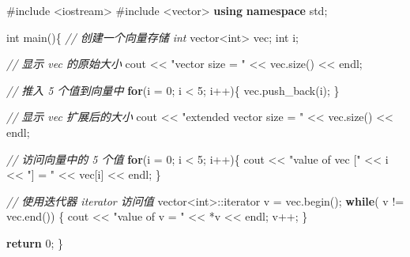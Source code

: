 \documentclass[
]{article}
\newenvironment{Shaded}{}{}
\newcommand{\CommentTok}[1]{\textcolor[rgb]{0.38,0.63,0.69}{\textit{#1}}}
\newcommand{\ControlFlowTok}[1]{\textcolor[rgb]{0.00,0.44,0.13}{\textbf{#1}}}
\newcommand{\DataTypeTok}[1]{\textcolor[rgb]{0.56,0.13,0.00}{#1}}
\newcommand{\DecValTok}[1]{\textcolor[rgb]{0.25,0.63,0.44}{#1}}
\newcommand{\ImportTok}[1]{#1}
\newcommand{\KeywordTok}[1]{\textcolor[rgb]{0.00,0.44,0.13}{\textbf{#1}}}
\newcommand{\NormalTok}[1]{#1}
\newcommand{\OperatorTok}[1]{\textcolor[rgb]{0.40,0.40,0.40}{#1}}
\newcommand{\PreprocessorTok}[1]{\textcolor[rgb]{0.74,0.48,0.00}{#1}}
\newcommand{\StringTok}[1]{\textcolor[rgb]{0.25,0.44,0.63}{#1}}
\begin{document}
\begin{Shaded}
\begin{Highlighting}[]
\PreprocessorTok{\#include }\ImportTok{\textless{}iostream\textgreater{}}
\PreprocessorTok{\#include }\ImportTok{\textless{}vector\textgreater{}}
\KeywordTok{using} \KeywordTok{namespace}\NormalTok{ std}\OperatorTok{;}

\DataTypeTok{int}\NormalTok{ main}\OperatorTok{()\{}
   \CommentTok{// 创建一个向量存储 int}
\NormalTok{   vector}\OperatorTok{\textless{}}\DataTypeTok{int}\OperatorTok{\textgreater{}}\NormalTok{ vec}\OperatorTok{;} 
   \DataTypeTok{int}\NormalTok{ i}\OperatorTok{;}

   \CommentTok{// 显示 vec 的原始大小}
\NormalTok{   cout }\OperatorTok{\textless{}\textless{}} \StringTok{"vector size = "} \OperatorTok{\textless{}\textless{}}\NormalTok{ vec}\OperatorTok{.}\NormalTok{size}\OperatorTok{()} \OperatorTok{\textless{}\textless{}}\NormalTok{ endl}\OperatorTok{;}

   \CommentTok{// 推入 5 个值到向量中}
   \ControlFlowTok{for}\OperatorTok{(}\NormalTok{i }\OperatorTok{=} \DecValTok{0}\OperatorTok{;}\NormalTok{ i }\OperatorTok{\textless{}} \DecValTok{5}\OperatorTok{;}\NormalTok{ i}\OperatorTok{++)\{}
\NormalTok{      vec}\OperatorTok{.}\NormalTok{push\_back}\OperatorTok{(}\NormalTok{i}\OperatorTok{);}
   \OperatorTok{\}}

   \CommentTok{// 显示 vec 扩展后的大小}
\NormalTok{   cout }\OperatorTok{\textless{}\textless{}} \StringTok{"extended vector size = "} \OperatorTok{\textless{}\textless{}}\NormalTok{ vec}\OperatorTok{.}\NormalTok{size}\OperatorTok{()} \OperatorTok{\textless{}\textless{}}\NormalTok{ endl}\OperatorTok{;}

   \CommentTok{// 访问向量中的 5 个值}
   \ControlFlowTok{for}\OperatorTok{(}\NormalTok{i }\OperatorTok{=} \DecValTok{0}\OperatorTok{;}\NormalTok{ i }\OperatorTok{\textless{}} \DecValTok{5}\OperatorTok{;}\NormalTok{ i}\OperatorTok{++)\{}
\NormalTok{      cout }\OperatorTok{\textless{}\textless{}} \StringTok{"value of vec ["} \OperatorTok{\textless{}\textless{}}\NormalTok{ i }\OperatorTok{\textless{}\textless{}} \StringTok{"] = "} \OperatorTok{\textless{}\textless{}}\NormalTok{ vec}\OperatorTok{[}\NormalTok{i}\OperatorTok{]} \OperatorTok{\textless{}\textless{}}\NormalTok{ endl}\OperatorTok{;}
   \OperatorTok{\}}

   \CommentTok{// 使用迭代器 iterator 访问值}
\NormalTok{   vector}\OperatorTok{\textless{}}\DataTypeTok{int}\OperatorTok{\textgreater{}::}\NormalTok{iterator v }\OperatorTok{=}\NormalTok{ vec}\OperatorTok{.}\NormalTok{begin}\OperatorTok{();}
   \ControlFlowTok{while}\OperatorTok{(}\NormalTok{ v }\OperatorTok{!=}\NormalTok{ vec}\OperatorTok{.}\NormalTok{end}\OperatorTok{())} \OperatorTok{\{}
\NormalTok{      cout }\OperatorTok{\textless{}\textless{}} \StringTok{"value of v = "} \OperatorTok{\textless{}\textless{}} \OperatorTok{*}\NormalTok{v }\OperatorTok{\textless{}\textless{}}\NormalTok{ endl}\OperatorTok{;}
\NormalTok{      v}\OperatorTok{++;}
   \OperatorTok{\}}

   \ControlFlowTok{return} \DecValTok{0}\OperatorTok{;}
\OperatorTok{\}}
\end{Highlighting}
\end{Shaded}
\end{document}
